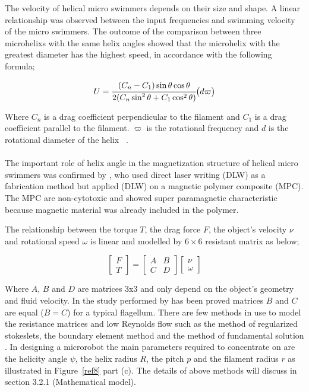 \documentclass[12pt,a4paper,titlepage]{report}
\begin{document}
The velocity of helical micro swimmers depends on their size and shape. A linear relationship was 
observed between the input frequencies and swimming velocity of the micro swimmers. The outcome of 
the comparison between three microhelixs with the same helix angles showed that the microhelix with the
 greatest diameter has the highest speed, in accordance with the following formula;

\begin{equation}
  U = {\cfrac{(C_n - C_1) \sin \theta \cos \theta}{2(C_n \sin^2 \theta + C_1 \cos^2 \theta)}} \big( d \varpi \big)
\end{equation} 

Where $C_n$ is a drag coefficient perpendicular to the filament and $C_1$ is a drag coefficient
 parallel to the filament. $ \varpi$ is the rotational frequency and $d$ is the rotational diameter of 
the helix ~\citep{tottori2012magnetic}.  



\paragraph{}
The important role of helix angle in the magnetization structure of helical micro swimmers 
was confirmed by \citeauthor{peyer2013bacteria} \citep{peyer2013bacteria}, who used direct laser writing (DLW) as a fabrication method but 
applied (DLW) on a magnetic polymer composite (MPC). The MPC are non-cytotoxic and showed 
super paramagnetic characteristic because magnetic material was already included in the polymer. 

The relationship between the torque $T$, the drag force $F$, the object\rq{}s velocity $\nu$ and rotational 
speed $\omega$ is linear and modelled by $6\times6$ resistant matrix as below;



\[
\begin{bmatrix} F\\ 
T \end{bmatrix}  =\begin{bmatrix} A & B \\ 
C & D \end{bmatrix}  \begin{bmatrix} \nu
 \\ \omega
\end{bmatrix}
\]




Where $A$, $B$ and $D$ are matrices 3x3 and only depend on the object\rq{}s geometry and fluid velocity.
In the study performed by \citeauthor{purcell1997efficiency} \citep{purcell1997efficiency} has been proved 
matrices $B$ and $C$ are equal ($B = C$) for a typical flagellum. 
There are few methods in use to model the resistance matrices and low Reynolds flow such as the 
method of regularized stokeslets, the boundary element method and the method of fundamental solution
. In designing a microrobot the main parameters required to concentrate on are the helicity angle $\psi$, 
the helix radius $R$, the pitch $p$ and the filament radius $r$ as illustrated in Figure~\ref{ref8} part (c). 
The details of above methods will discuss in section 3.2.1 (Mathematical model).
\end{document}
